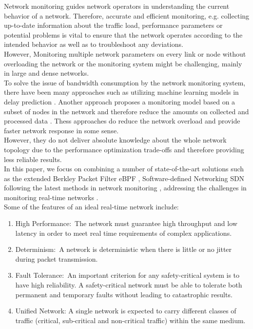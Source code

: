 Network monitoring guides network operators in understanding the current behavior of a network.
Therefore, accurate and efficient monitoring, e.g. collecting up-to-date information about the traffic load, performance
parameters or potential problems is vital to ensure that the network operates according to the intended behavior as well as to troubleshoot any deviations.\\
However, Monitoring multiple network parameters on every link or node without overloading the network or the monitoring system
might be challenging, mainly in large and dense networks.\\

To solve the issue of bandwidth consumption by the network monitoring system, there have been many approaches such as utilizing machine learning models in delay prediction \cite{8638081}.
Another approach proposes a monitoring model based on a subset of nodes in the network and therefore reduce the amounts on collected and processed data \cite{paluchov10}.
Thess approaches do reduce the network overload and provide faster network response in some sense.\\
However, they do not deliver absolute knowledge about the whole network topology due to the
performance optimization trade-offs and therefore providing less reliable results.\\

In this paper, we focus on combining a number of state-of-the-art solutions such as the extended Berkley Packet Filter eBPF \cite{8493077},
Software-defined Networking SDN \cite{6838227} following the latest methods in network monitoring \cite{4644132},
addressing the challenges in monitoring real-time networks \cite{LEE201484}.\\
Some of the features of an ideal real-time network include:
\begin{enumerate}
    \item High Performance: The network must guarantee high throughput and low latency in order to meet real time requirements of complex applications.
    \item Determinism: A network is deterministic when there is little or no jitter during packet transmission.
    \item Fault Tolerance: An important criterion for any safety-critical system is to have high reliability. A safety-critical network must be able to tolerate both permanent and temporary faults without leading to catastrophic results.
    \item Unified Network: A single network is expected to carry different classes of traffic (critical, sub-critical and non-critical traffic) within the same medium.
\end{enumerate}

